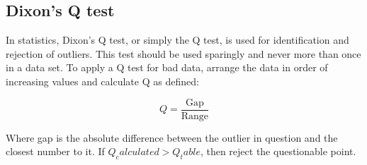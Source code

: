 \subsection{Dixon's Q test}

In statistics, Dixon's Q test, or simply the Q test, is used for identification and rejection of outliers. 
This test should be used sparingly and never more than once in a data set. To apply a Q test for bad data, arrange the data in order of increasing values and calculate Q as defined:

\begin{equation}
Q = \frac{\mbox{Gap}}{\mbox{Range}}
\end{equation}

Where gap is the absolute difference between the outlier in question and the closest number to it. 
If $Q_calculated > Q_table$, then reject the questionable point.

